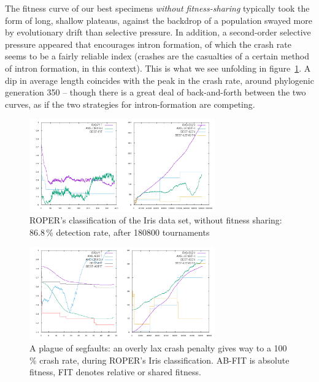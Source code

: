
The fitness curve of our best
specimens \textit{without fitness-sharing} typically took the form of long, shallow plateaus, against the backdrop of a population swayed more by evolutionary
drift than selective pressure.  In addition, a second-order selective pressure appeared that encourages intron formation,
of which the crash rate seems to be a fairly reliable index
(crashes are the casualties of a certain method of intron
formation, in this context). This is what we see unfolding in
figure~\ref{fig:good-nosharing}. A dip in average length coincides with the peak in the crash rate, around phylogenic generation 350 -- though there is a great deal of
back-and-forth between the two curves, as if the two strategies
for intron-formation are competing.%

\begin{figure}
  \includegraphics[height=4cm]{examples/iris/good-nosharing/good-nosharing.png}
  \caption{ROPER's classification of the Iris data set, without
  fitness sharing: 86.8\,\% detection rate, after 180800
  tournaments}
  \label{fig:good-nosharing}
\end{figure}

\begin{figure}
  \includegraphics[height=4cm]{examples/iris/plague/plague.png}
  \caption{A plague of segfaults: an overly lax crash penalty
  gives way to a 100\,\% crash rate, during ROPER's Iris
  classification. {AB-FIT} is absolute fitness,
  FIT denotes relative or shared fitness.}
  \label{fig:plague}
\end{figure}

